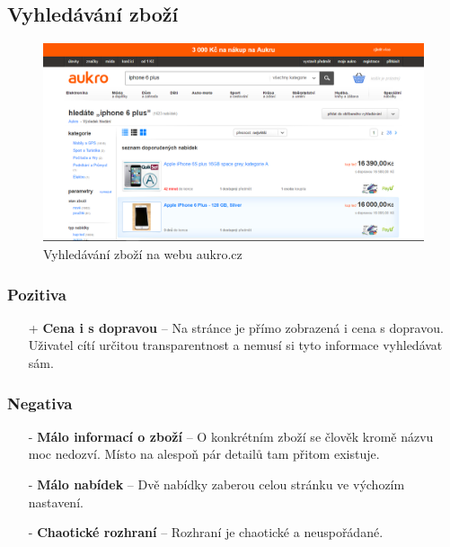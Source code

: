 
\newpage
\subsection{Vyhledávání zboží}
\begin{figure}[h]
    \centering
    \includegraphics[width=1.0\textwidth]{media/aukro/search.png}
    \caption{Vyhledávání zboží na webu aukro.cz}
    \label{fig:aukro:search}
\end{figure}
\subsubsection*{Pozitiva}
\begin{itemize}
    \item[+] \textbf{Cena i s dopravou} -- Na stránce je přímo zobrazená i cena s dopravou. Uživatel cítí určitou transparentnost a nemusí si tyto informace vyhledávat sám.
\end{itemize}
\subsubsection*{Negativa}
\begin{itemize}
    \item[-] \textbf{Málo informací o zboží} -- O konkrétním zboží se člověk kromě názvu moc nedozví. Místo na alespoň pár detailů tam přitom existuje.
    \item[-] \textbf{Málo nabídek} -- Dvě nabídky zaberou celou stránku ve výchozím nastavení.
    \item[-] \textbf{Chaotické rozhraní} -- Rozhraní je chaotické a neuspořádané.
\end{itemize}



